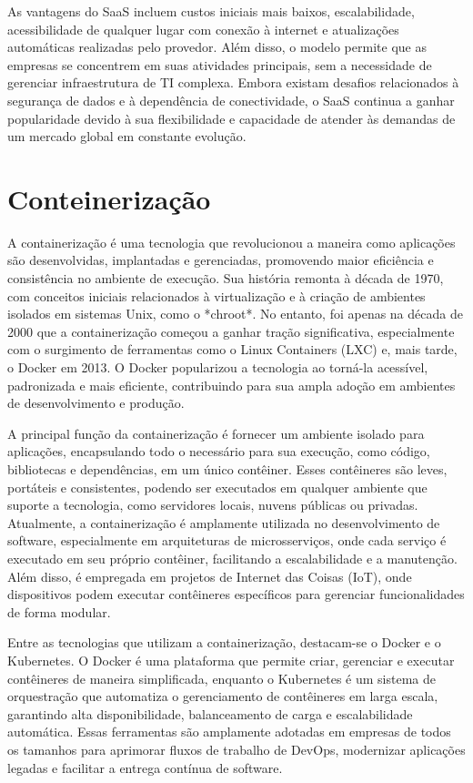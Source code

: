 As vantagens do SaaS incluem custos iniciais mais baixos, escalabilidade, acessibilidade de qualquer lugar com conexão à internet e atualizações automáticas realizadas pelo provedor. Além disso, o modelo permite que as empresas se concentrem em suas atividades principais, sem a necessidade de gerenciar infraestrutura de TI complexa. Embora existam desafios relacionados à segurança de dados e à dependência de conectividade, o SaaS continua a ganhar popularidade devido à sua flexibilidade e capacidade de atender às demandas de um mercado global em constante evolução.
\section{Conteinerização}

A containerização é uma tecnologia que revolucionou a maneira como aplicações são desenvolvidas, implantadas e gerenciadas, promovendo maior eficiência e consistência no ambiente de execução. Sua história remonta à década de 1970, com conceitos iniciais relacionados à virtualização e à criação de ambientes isolados em sistemas Unix, como o *chroot*. No entanto, foi apenas na década de 2000 que a containerização começou a ganhar tração significativa, especialmente com o surgimento de ferramentas como o Linux Containers (LXC) e, mais tarde, o Docker em 2013. O Docker popularizou a tecnologia ao torná-la acessível, padronizada e mais eficiente, contribuindo para sua ampla adoção em ambientes de desenvolvimento e produção.

A principal função da containerização é fornecer um ambiente isolado para aplicações, encapsulando todo o necessário para sua execução, como código, bibliotecas e dependências, em um único contêiner. Esses contêineres são leves, portáteis e consistentes, podendo ser executados em qualquer ambiente que suporte a tecnologia, como servidores locais, nuvens públicas ou privadas. Atualmente, a containerização é amplamente utilizada no desenvolvimento de software, especialmente em arquiteturas de microsserviços, onde cada serviço é executado em seu próprio contêiner, facilitando a escalabilidade e a manutenção. Além disso, é empregada em projetos de Internet das Coisas (IoT), onde dispositivos podem executar contêineres específicos para gerenciar funcionalidades de forma modular.

Entre as tecnologias que utilizam a containerização, destacam-se o Docker e o Kubernetes. O Docker é uma plataforma que permite criar, gerenciar e executar contêineres de maneira simplificada, enquanto o Kubernetes é um sistema de orquestração que automatiza o gerenciamento de contêineres em larga escala, garantindo alta disponibilidade, balanceamento de carga e escalabilidade automática. Essas ferramentas são amplamente adotadas em empresas de todos os tamanhos para aprimorar fluxos de trabalho de DevOps, modernizar aplicações legadas e facilitar a entrega contínua de software.

